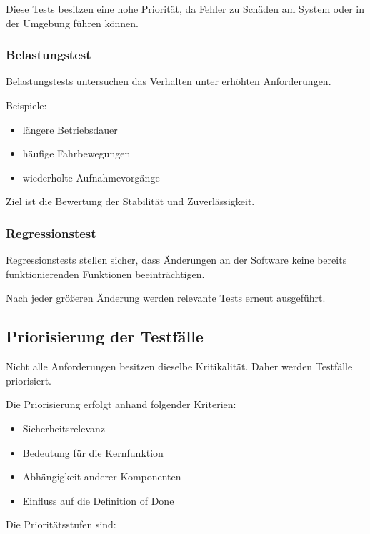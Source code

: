 \documentclass[
  a4paper,
  12pt,
  DIV=12,        %
  parskip=half,  %
  headings=small %
]{scrartcl}
\theoremstyle{definition}
\providecommand{\tightlist}{%
  \setlength{\itemsep}{0pt}\setlength{\parskip}{0pt}}
\theoremstyle{definition}
\begin{document}
Diese Tests besitzen eine hohe Priorität, da Fehler zu Schäden am System
oder in der Umgebung führen können.

\subsubsection{Belastungstest}\label{belastungstest}

Belastungstests untersuchen das Verhalten unter erhöhten Anforderungen.

Beispiele:

\begin{itemize}
\tightlist
\item
  längere Betriebsdauer
\item
  häufige Fahrbewegungen
\item
  wiederholte Aufnahmevorgänge
\end{itemize}

Ziel ist die Bewertung der Stabilität und Zuverlässigkeit.

\subsubsection{Regressionstest}\label{regressionstest}

Regressionstests stellen sicher, dass Änderungen an der Software keine
bereits funktionierenden Funktionen beeinträchtigen.

Nach jeder größeren Änderung werden relevante Tests erneut ausgeführt.

\subsection{Priorisierung der
Testfälle}\label{priorisierung-der-testfuxe4lle}

Nicht alle Anforderungen besitzen dieselbe Kritikalität. Daher werden
Testfälle priorisiert.

Die Priorisierung erfolgt anhand folgender Kriterien:

\begin{itemize}
\tightlist
\item
  Sicherheitsrelevanz
\item
  Bedeutung für die Kernfunktion
\item
  Abhängigkeit anderer Komponenten
\item
  Einfluss auf die Definition of Done
\end{itemize}

Die Prioritätsstufen sind:
\end{document}
